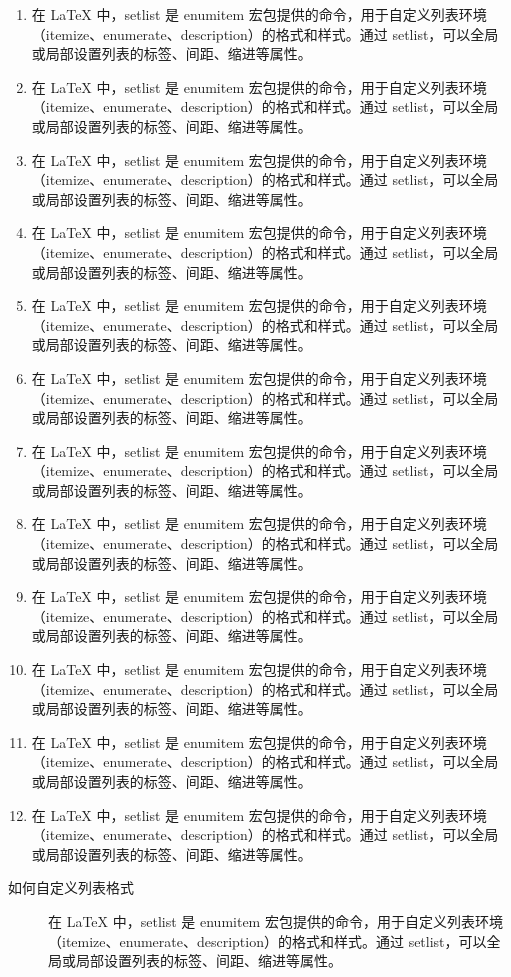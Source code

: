 \documentclass{ctexart}
\begin{document}
\begin{enumerate}
  \item 在 LaTeX 中，setlist 是 enumitem 宏包提供的命令，用于自定义列表环境（itemize、enumerate、description）的格式和样式。通过 setlist，可以全局或局部设置列表的标签、间距、缩进等属性。
  \item 在 LaTeX 中，setlist 是 enumitem 宏包提供的命令，用于自定义列表环境（itemize、enumerate、description）的格式和样式。通过 setlist，可以全局或局部设置列表的标签、间距、缩进等属性。
  \item 在 LaTeX 中，setlist 是 enumitem 宏包提供的命令，用于自定义列表环境（itemize、enumerate、description）的格式和样式。通过 setlist，可以全局或局部设置列表的标签、间距、缩进等属性。
  \item 在 LaTeX 中，setlist 是 enumitem 宏包提供的命令，用于自定义列表环境（itemize、enumerate、description）的格式和样式。通过 setlist，可以全局或局部设置列表的标签、间距、缩进等属性。
  \item 在 LaTeX 中，setlist 是 enumitem 宏包提供的命令，用于自定义列表环境（itemize、enumerate、description）的格式和样式。通过 setlist，可以全局或局部设置列表的标签、间距、缩进等属性。
  \item 在 LaTeX 中，setlist 是 enumitem 宏包提供的命令，用于自定义列表环境（itemize、enumerate、description）的格式和样式。通过 setlist，可以全局或局部设置列表的标签、间距、缩进等属性。
  \item 在 LaTeX 中，setlist 是 enumitem 宏包提供的命令，用于自定义列表环境（itemize、enumerate、description）的格式和样式。通过 setlist，可以全局或局部设置列表的标签、间距、缩进等属性。
  \item 在 LaTeX 中，setlist 是 enumitem 宏包提供的命令，用于自定义列表环境（itemize、enumerate、description）的格式和样式。通过 setlist，可以全局或局部设置列表的标签、间距、缩进等属性。
  \item 在 LaTeX 中，setlist 是 enumitem 宏包提供的命令，用于自定义列表环境（itemize、enumerate、description）的格式和样式。通过 setlist，可以全局或局部设置列表的标签、间距、缩进等属性。
  \item 在 LaTeX 中，setlist 是 enumitem 宏包提供的命令，用于自定义列表环境（itemize、enumerate、description）的格式和样式。通过 setlist，可以全局或局部设置列表的标签、间距、缩进等属性。
  \item 在 LaTeX 中，setlist 是 enumitem 宏包提供的命令，用于自定义列表环境（itemize、enumerate、description）的格式和样式。通过 setlist，可以全局或局部设置列表的标签、间距、缩进等属性。
  \item 在 LaTeX 中，setlist 是 enumitem 宏包提供的命令，用于自定义列表环境（itemize、enumerate、description）的格式和样式。通过 setlist，可以全局或局部设置列表的标签、间距、缩进等属性。
\end{enumerate}

\begin{description}
  \item[如何自定义列表格式] 在 LaTeX 中，setlist 是 enumitem 宏包提供的命令，用于自定义列表环境（itemize、enumerate、description）的格式和样式。通过 setlist，可以全局或局部设置列表的标签、间距、缩进等属性。
\end{description}
\end{document}
